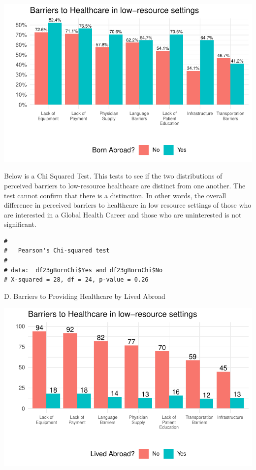 \documentclass[
  letterpaper,
  DIV=11,
  numbers=noendperiod]{scrartcl}
\begin{document}
\includegraphics{GlobalHealthQuarto11-15_files/figure-pdf/unnamed-chunk-7-1.pdf}

\newpage

Below is a Chi Squared Test. This tests to see if the two distributions
of perceived barriers to low-resource healthcare are distinct from one
another. The test cannot confirm that there is a distinction. In other
words, the overall difference in perceived barriers to healthcare in low
resource settings of those who are interested in a Global Health Career
and those who are uninterested is not significant.

\begin{verbatim}
# 
#   Pearson's Chi-squared test
# 
# data:  df23gBornChi$Yes and df23gBornChi$No
# X-squared = 28, df = 24, p-value = 0.26
\end{verbatim}

\newpage

D. Barriers to Providing Healthcare by Lived Abroad

\includegraphics{GlobalHealthQuarto11-15_files/figure-pdf/unnamed-chunk-9-1.pdf}
\end{document}
